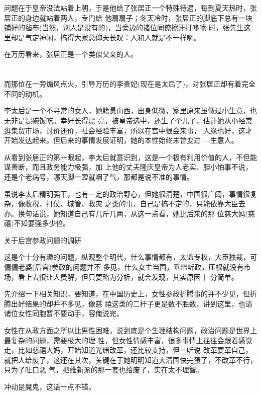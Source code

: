 \documentclass[11pt,a4paper,onecolumn]{article}
\begin{document}
问题在于皇帝没法站着上朝，于是他给了张居正一个特殊待遇，每到夏天热时，张居正的身边就站着两人，专门给
他扇扇子；冬天冷时，张居正的脚底下总有一块铺好的毡布(当然，别人是没有的)，当旁边的诸位同僚擦汗打哆嗦
时，张先生这里却是气定神闲，搞得大家总仰天长叹：人和人就是不一样啊。

在万历看来，张居正是一个类似父亲的人。

\section[\thesection]{}

而那位在一旁煽风点火，引导万历的李贵妃(现在是太后了)，对张居正却有着完全不同的动机。

李太后是一个不寻常的女人，她籍贯山西，出身低微，家里原来虽做过小生意，也无非是混碗饭吃。幸好长得漂
亮，被皇帝选中，还生了个儿子，估计她从小经常逛集贸市场，讨价还价，社会经验丰富，所以在宫中很会来事，
人缘也好，这才开始发达起来。但后来的事情发展证明，她的本性始终未曾变过----生意人。

从看到张居正的第一眼起，李太后就意识到，这是一个极有利用价值的人，不但能谋善断，而且政务能力极强，加
上他的丈夫隆庆皇帝为人老实、胆小怕事不说，还是个老病号，哪天脚一蹬就咽了气，那都是说不准的事情。

虽说李太后精明强干，也有一定的政治野心，但她很清楚，中国很广阔，事情很复杂，像收税、打仗、城管、救灾
之类的事，自己是搞不定的，只能依靠大臣去办。换句话说，她知道自己有几斤几两，从这一点看，她比后来的那
位慈大妈(慈禧)不知要强多少倍。

关于后宫参政问题的调研

这是个十分有趣的问题，纵观整个明代，什么事情都有，太监专权，大臣独裁，可偏偏老婆(后宫)参政的问题并不
多见，什么女主当国，垂帘听政，压根就没有市场，看上去很让人费解，但只要略为分析，就会发现，其实原因十
分简单。

先介绍一下相关知识，要知道，在中国历史上，女性参政折腾事的并不少见，但折腾出好结果的却并不多见，像慈
禧这类的二杆子更是数不胜数，讲到这里，也请诸位女性同胞暂不要动手，容俺说完。

女性在从政方面之所以比男性困难，说到底是个生理结构问题，政治问题是世界上最复杂的问题，需要极大的理
性，但女性情感丰富，很多事情上往往会跟着感觉走，比如慈禧大妈，开始知道光绪改革，还比较支持，但一听说
改革要革自己，就把人给废了，这还在其次，关键在于她明明知道大清国快完蛋了，不改革不行，只为了吐口恶
气，把维新派的那一套也给废了，实在太不理智。

冲动是魔鬼，这话一点不错。

\section[\thesection]{}
\end{document}
